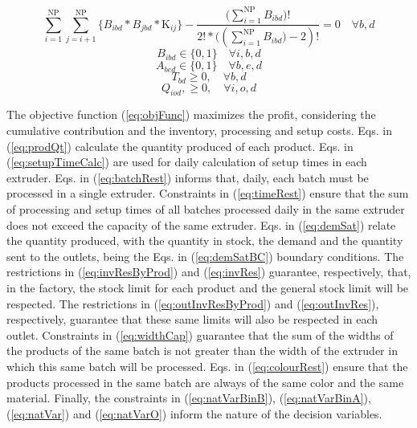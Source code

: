 \begin{equation}
	\sum_{i=1}^{\mathrm{NP}}{\sum_{j=i+1}^{\mathrm{NP}}\{B_{ibd}*B_{jbd}*\mathrm{K}_{ij}\}} - \frac{(\sum_{i=1}^{\mathrm{NP}}{B_{ibd})}! }{2! * ((\sum_{i=1}^{\mathrm{NP}}{B_{ibd})} -2)!} = 0 \quad \forall{b, d}
	\label{eq:colourRest}
\end{equation}
\begin{equation}
	B_{ibd}  \in \{0,1\} \quad \forall{i, b, d}
	\label{eq:natVarBinB}
\end{equation}
\begin{equation}
	A_{bed}  \in \{0,1\} \quad \forall{b, e, d}
	\label{eq:natVarBinA}
\end{equation}
\begin{equation}
	T_{bd} \geq 0, \quad \forall{b, d}
	\label{eq:natVar}
\end{equation}
\begin{equation}
	Q_{iod},  \geq 0, \quad \forall{i, o, d}
	\label{eq:natVarO}
\end{equation}

The objective function (\ref{eq:objFunc}) maximizes the profit, considering the cumulative contribution and the inventory, processing and setup costs. Eqs. in (\ref{eq:prodQt}) calculate the quantity produced of each product. Eqs. in (\ref{eq:setupTimeCalc}) are used for daily calculation of setup times in each extruder. Eqs. in (\ref{eq:batchRest}) informs that, daily, each batch must be processed in a single extruder. Constraints in (\ref{eq:timeRest}) ensure that the sum of processing and setup times of all batches processed daily in the same extruder does not exceed the capacity of the same extruder. Eqs. in (\ref{eq:demSat}) relate the quantity produced, with the quantity in stock, the demand and the quantity sent to the outlets, being the Eqs. in (\ref{eq:demSatBC}) boundary conditions. The restrictions in (\ref{eq:invResByProd}) and (\ref{eq:invRes}) guarantee, respectively, that, in the factory, the stock limit for each product and the general stock limit will be respected.  The restrictions in (\ref{eq:outInvResByProd}) and (\ref{eq:outInvRes}), respectively, guarantee that these same limits will also be respected in each outlet. Constraints in (\ref{eq:widthCap}) guarantee that the sum of the widths of the products of the same batch is not greater than the width of the extruder in which this same batch will be processed. Eqs. in (\ref{eq:colourRest}) ensure that the products processed in the same batch are always of the same color and the same material. Finally, the constraints in (\ref{eq:natVarBinB}), (\ref{eq:natVarBinA}), (\ref{eq:natVar}) and (\ref{eq:natVarO}) inform the nature of the decision variables.


